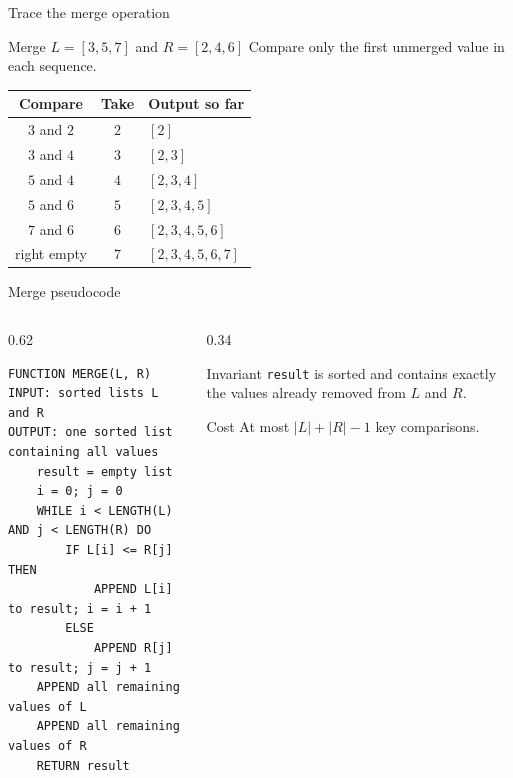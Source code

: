\documentclass[aspectratio=169]{beamer}
\begin{document}
\begin{frame}{Trace the merge operation}
  \small
  \begin{block}{Merge $L=[3,5,7]$ and $R=[2,4,6]$}
    Compare only the first unmerged value in each sequence.
  \end{block}
  \begin{center}
    \begin{tabular}{ccl}
      \toprule
      \textbf{Compare} & \textbf{Take} & \textbf{Output so far} \\
      \midrule
      $3$ and $2$ & $2$ & $[2]$ \\
      $3$ and $4$ & $3$ & $[2,3]$ \\
      $5$ and $4$ & $4$ & $[2,3,4]$ \\
      $5$ and $6$ & $5$ & $[2,3,4,5]$ \\
      $7$ and $6$ & $6$ & $[2,3,4,5,6]$ \\
      right empty & $7$ & $[2,3,4,5,6,7]$ \\
      \bottomrule
    \end{tabular}
  \end{center}
\end{frame}

\begin{frame}[fragile]{Merge pseudocode}
  \begin{columns}[T]
    \begin{column}{0.62\textwidth}
\begin{lstlisting}[style=pseudonumbered]
FUNCTION MERGE(L, R)
INPUT: sorted lists L and R
OUTPUT: one sorted list containing all values
    result = empty list
    i = 0; j = 0
    WHILE i < LENGTH(L) AND j < LENGTH(R) DO
        IF L[i] <= R[j] THEN
            APPEND L[i] to result; i = i + 1
        ELSE
            APPEND R[j] to result; j = j + 1
    APPEND all remaining values of L
    APPEND all remaining values of R
    RETURN result
\end{lstlisting}
    \end{column}
    \begin{column}{0.34\textwidth}
      \begin{block}{Invariant}
        \texttt{result} is sorted and contains exactly the values already
        removed from $L$ and $R$.
      \end{block}
      \begin{alertblock}{Cost}
        At most $|L|+|R|-1$ key comparisons.
      \end{alertblock}
    \end{column}
  \end{columns}
\end{frame}
\end{document}
